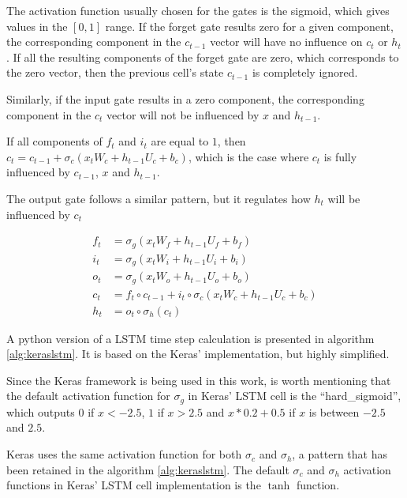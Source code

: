 The activation function usually chosen for the gates is the sigmoid, which gives values in the $[0,1]$ range. If the forget gate results zero for a given component, the corresponding component in the $c_{t-1}$ vector will have no influence on $c_t$ or $h_t$. If all the resulting components of the forget gate are zero, which corresponds to the zero vector, then the previous cell's state $c_{t-1}$ is completely ignored.

Similarly, if the input gate results in a zero component, the corresponding component in the $c_t$ vector will not be influenced by $x$ and $h_{t-1}$.

If all components of $f_t$ and $i_t$ are equal to $1$, then $c_t = c_{t-1} + \sigma_c(x_t W_{c} + h_{t-1} U_{c} + b_c)$, which is the case where $c_t$ is fully influenced by $c_{t-1}$, $x$ and $h_{t-1}$.

The output gate follows a similar pattern, but it regulates how $h_t$ will be influenced by $c_t$

    \begin{align}
\label{eq:lstmequationsstart}     
f_t &= \sigma_g(x_t W_{f} + h_{t-1} U_{f} + b_f) \\
i_t &= \sigma_g(x_t W_{i} + h_{t-1} U_{i} + b_i) \\
o_t &= \sigma_g(x_t W_{o} + h_{t-1} U_{o} + b_o) \\
c_t &= f_t \circ c_{t-1} + i_t \circ \sigma_c(x_t W_{c} + h_{t-1} U_{c} + b_c) \\
\label{eq:lstmequationsend}
h_t &= o_t \circ \sigma_h(c_t)
    \end{align}


A python version of a LSTM time step calculation is presented in algorithm \ref{alg:keraslstm}. It is based on the Keras' implementation, but highly simplified.

Since the Keras framework is being used in this work, is worth mentioning that the default activation function for $\sigma_g$ in Keras' LSTM cell is the ``hard\_sigmoid'', which outputs $0$ if $x<-2.5$, $1$ if $x>2.5$ and $x*0.2 + 0.5$ if $x$ is between $-2.5$ and $2.5$.

Keras uses the same activation function for both $\sigma_c$ and $\sigma_h$, 
a pattern that has been retained in the algorithm \ref{alg:keraslstm}. The default $\sigma_c$ and $\sigma_h$ activation functions in Keras' LSTM cell implementation is the $\tanh$ function.

